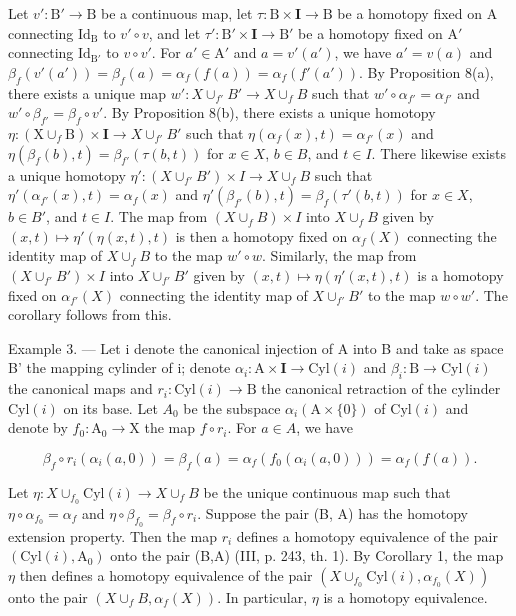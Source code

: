Let \(v' \colon \mathrm{B}' \to \mathrm{B}\) be a continuous map, let \(\tau \colon \mathrm{B} \times \mathbf{I} \to \mathrm{B}\) be a homotopy fixed on A connecting \(\mathrm{Id}_{\mathrm{B}}\) to \(v' \circ v\), and let \(\tau' \colon \mathrm{B}' \times \mathbf{I} \to \mathrm{B}'\) be a homotopy fixed on \(\mathrm{A}'\) connecting \(\mathrm{Id}_{\mathrm{B}'}\) to \(v \circ v'\). For \(a' \in \mathrm{A}'\) and \(a = v'(a')\), we have \(a' = v(a)\) and \(\beta_f(v'(a')) = \beta_f(a) = \alpha_f(f(a)) = \alpha_f(f'(a'))\). By Proposition 8(a), there exists a unique map \(w' \colon X \cup_{f'} B' \to X \cup_f B\) such that \(w' \circ \alpha_{f'} = \alpha_{f'}\) and \(w' \circ \beta_{f'} = \beta_f \circ v'\). By Proposition 8(b), there exists a unique homotopy \(\eta \colon (\mathrm{X} \cup_f \mathrm{B}) \times \mathbf{I} \to X \cup_{f'} B'\) such that \(\eta(\alpha_f(x), t) = \alpha_{f'}(x)\) and \(\eta(\beta_f(b), t) = \beta_{f'}(\tau(b, t))\) for \(x \in X\), \(b \in B\), and \(t \in I\). There likewise exists a unique homotopy \(\eta' \colon (X \cup_{f'} B') \times I \to X \cup_f B\) such that \(\eta'(\alpha_{f'}(x), t) = \alpha_f(x)\) and \(\eta'(\beta_{f'}(b), t) = \beta_f(\tau'(b, t))\) for \(x \in X\), \(b \in B'\), and \(t \in I\). The map from \((X \cup_f B) \times I\) into \(X \cup_f B\) given by \((x, t) \mapsto \eta'(\eta(x, t), t)\) is then a homotopy fixed on \(\alpha_f(X)\) connecting the identity map of \(X \cup_f B\) to the map \(w' \circ w\). Similarly, the map from \((X \cup_{f'} B') \times I\) into \(X \cup_{f'} B'\) given by \((x, t) \mapsto \eta(\eta'(x, t), t)\) is a homotopy fixed on \(\alpha_{f'}(X)\) connecting the identity map of \(X \cup_{f'} B'\) to the map \(w \circ w'\). The corollary follows from this.

Example 3. --- Let i denote the canonical injection of A into B and take as space B' the mapping cylinder of i; denote \(\alpha_{i}\colon\mathrm{A}\times\mathbf{I}\to\mathrm{Cyl}(i)\) and \(\beta_{i}\colon\mathrm{B}\to\mathrm{Cyl}(i)\) the canonical maps and \(r_{i}\colon\mathrm{Cyl}(i)\to\mathrm{B}\) the canonical retraction of the cylinder \(\mathrm{Cyl}(i)\) on its base. Let \(A_{0}\) be the subspace \(\alpha_{i}(\mathrm{A}\times\{0\})\) of \(\mathrm{Cyl}(i)\) and denote by \(f_{0}\colon\mathrm{A}_{0}\to\mathrm{X}\) the map \(f\circ r_{i}\). For \(a\in A\), we have

\[
\beta_ {f} \circ r _ {i} (\alpha_ {i} (a, 0)) = \beta_ {f} (a) = \alpha_ {f} (f _ {0} (\alpha_ {i} (a, 0))) = \alpha_ {f} (f (a)).
\]

Let \(\eta\colon X\cup_{f_0}\mathrm{Cyl}(i)\to X\cup_fB\) be the unique continuous map such that \(\eta\circ\alpha_{f_0}=\alpha_f\) and \(\eta\circ\beta_{f_0}=\beta_f\circ r_i\). Suppose the pair (B, A) has the homotopy extension property. Then the map \(r_i\) defines a homotopy equivalence of the pair \((\mathrm{Cyl}(i),\mathrm{A}_0)\) onto the pair (B,A) (III, p. 243, th. 1). By Corollary 1, the map \(\eta\) then defines a homotopy equivalence of the pair \((X\cup_{f_0}\mathrm{Cyl}(i),\alpha_{f_0}(X))\) onto the pair \((X\cup_fB,\alpha_f(X))\). In particular, \(\eta\) is a homotopy equivalence.

